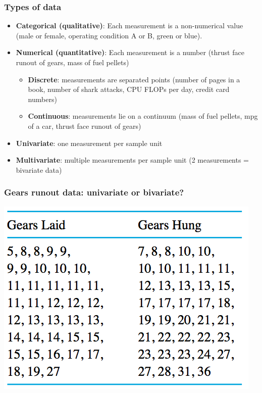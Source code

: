 \documentclass[handout]{beamer}\usepackage{graphicx, color}
\numberwithin{equation}{section}
\begin{document}
\begin{frame}
\frametitle{Types of data}
\begin{itemize}
\item {\bf Categorical (qualitative)}: Each measurement is a non-numerical value (male or female, operating condition A or B, green or blue).
\pause \item {\bf Numerical (quantitative)}: Each measurement is a number (thrust face runout of gears, mass of fuel pellets)
\begin{itemize}
\pause \item {\bf Discrete}: measurements are separated points (number of pages in a book, number of shark attacks, CPU FLOPs per day, credit card numbers)
\pause \item {\bf Continuous}: measurements lie on a continuum (mass of fuel pellets, mpg of a car, thrust face runout of gears)
\end{itemize}
\pause \item {\bf Univariate}: one measurement per sample unit
\pause \item {\bf Multivariate}: multiple measurements per sample unit (2 measurements = bivariate data)
\end{itemize}
\end{frame}


\begin{frame}
\frametitle{Gears runout data: univariate or bivariate?}

\begin{center}
 \includegraphics{../../fig/gearstable.png} 
\end{center}

\end{frame}
\end{document}
